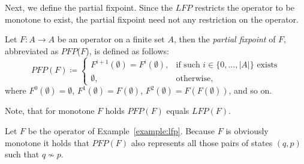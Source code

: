 Next, we define the partial fixpoint. Since the
$\mathit{LFP}$ restricts the operator to be monotone to exist, the partial fixpoint need not any
restriction on the operator.

\begin{definition}
    Let $F\colon A \rightarrow A$ be an operator on a finite set $A$, then the \emph{partial
    fixpoint} of $F$, abbreviated as $\mathit{PFP}$($F$), is defined as follows:
    \[\mathit{PFP}(F)\coloneqq\begin{cases}
               F^{i+1}(\emptyset)=F^i(\emptyset),  & \text{if such } i \in \{0,\dots,|A|\} \text{ exists}\\
               \emptyset, & \text{otherwise,}
    \end{cases}\]
    where $F^0(\emptyset) = \emptyset$, $F^1(\emptyset) = F(\emptyset)$, $F^2(\emptyset) = F(F(\emptyset))$, and so on.
\end{definition}

Note, that for monotone $F$ holds $\mathit{PFP}(F)$ equals $\mathit{LFP}(F)$. 

\begin{example}
\label{example:pfp}
Let $F$ be the operator of Example~\ref{example:lfp}. Because $F$ is obviously monotone it holds that $PFP(F)$ also represents all those pairs of states $(q, p)$ such that $q\not\sim p$.
\end{example}